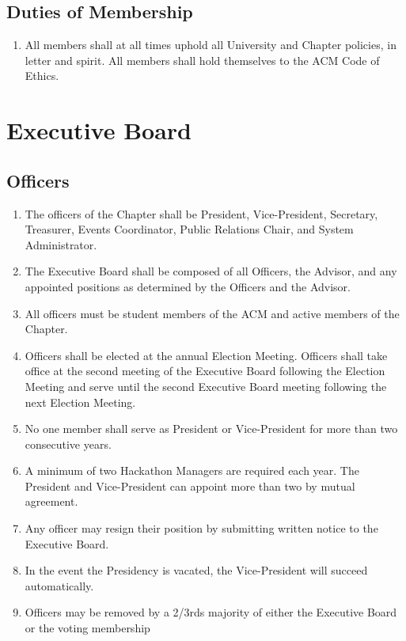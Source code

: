 \documentclass[12pt, letterpaper, oneside]{book}
\begin{document}
\section{Duties of Membership}
\begin{enumerate}
    \item All members shall at all times uphold all University and Chapter
        policies, in letter and spirit. All members shall hold themselves to the
        ACM Code of Ethics.
\end{enumerate}

\chapter{Executive Board}
\section{Officers}
\begin{enumerate}
    \item The officers of the Chapter shall be President, Vice-President,
        Secretary, Treasurer, Events Coordinator, Public Relations Chair, and
        System Administrator.
    \item The Executive Board shall be composed of all Officers, the Advisor,
        and any appointed positions as determined by the Officers and the
        Advisor.
    \item All officers must be student members of the ACM and active members of
        the Chapter.
    \item Officers shall be elected at the annual Election Meeting. Officers
        shall take office at the second meeting of the Executive Board following
        the Election Meeting and serve until the second Executive Board meeting
        following the next Election Meeting.
    \item No one member shall serve as President or Vice-President for more
        than two consecutive years.
    \item A minimum of two Hackathon Managers are required each year. The
        President and Vice-President can appoint more than two by mutual
        agreement.
    \item Any officer may resign their position by submitting written notice to
        the Executive Board.
    \item In the event the Presidency is vacated, the Vice-President will
        succeed automatically.
    \item Officers may be removed by a 2/3rds majority of either the Executive
        Board or the voting membership 
\end{enumerate}
\end{document}
